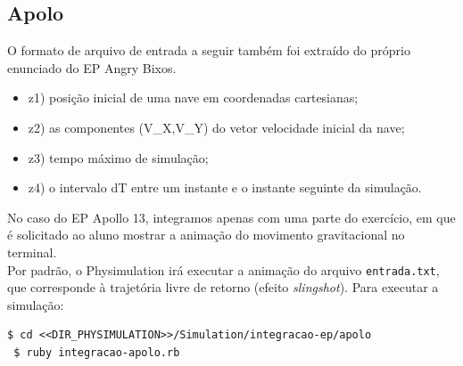 \subsection{Apolo}

O formato de arquivo de entrada a seguir também foi extraído do próprio enunciado do EP Angry Bixos.

\begin{itemize}
  \item z1) posição inicial de uma nave em coordenadas cartesianas;                    
  \item z2) as componentes (V\_X,V\_Y) do vetor velocidade inicial da nave;
  \item z3) tempo máximo de simulação;               
  \item z4) o intervalo dT entre um instante e o instante seguinte da simulação.
\end{itemize}

No caso do EP Apollo 13, integramos apenas com uma parte do exercício, em que é solicitado ao aluno mostrar a animação do movimento gravitacional no terminal. \\

Por padrão, o Physimulation irá executar a animação do arquivo {\tt\small entrada.txt}, que corresponde à trajetória livre de retorno (efeito \textit{slingshot}). Para executar a simulação: 

\begin{Verbatim}[fontsize=\footnotesize]
 $ cd <<DIR_PHYSIMULATION>>/Simulation/integracao-ep/apolo
 $ ruby integracao-apolo.rb 
\end{Verbatim}

